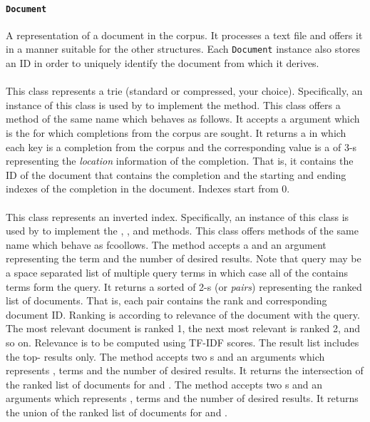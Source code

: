 \documentclass[addpoints]{exam}
\begin{document}
\paragraph{\texttt{Document}} A representation of a document in the corpus. It processes a text file and offers it in a manner suitable for the other structures. Each \texttt{Document} instance also stores an ID in order to uniquely identify the document from which it derives.

\paragraph{} This class represents a trie (standard or compressed, your choice). Specifically, an instance of this class is used by  to implement the  method. This class offers a method of the same name which behaves as follows. It accepts a  argument which is the  for which completions from the corpus are sought. It returns a  in which each key is a completion from the corpus and the corresponding value is a  of 3-s representing the \textit{location} information of the completion. That is, it contains the ID of the document that contains the completion and the starting and ending indexes of the completion in the document. Indexes start from 0.


\paragraph{} This class represents an inverted index. Specifically, an instance of this class is used by  to implement the , , and  methods. This class offers methods of the same name which behave as fcoollows. The  method accepts a  and an  argument representing the  term and the number of desired results. Note that query may be a space separated list of multiple query terms in which case all of the contains terms form the query. It returns a sorted  of 2-s (or \textit{pairs}) representing the ranked list of documents. That is, each pair contains the rank and corresponding document ID. Ranking is according to relevance of the document with the query. The most relevant document is ranked 1, the next most relevant is ranked 2, and so on. Relevance is to be computed using TF-IDF scores. The result list includes the top- results only.
The  method accepts two s and an  arguments which represents ,  terms and the number of desired results. It returns the intersection of the ranked list of documents for  and . The  method accepts two s and an  arguments which represents ,  terms and the number of desired results. It returns the union of the ranked list of documents for  and .
\end{document}
